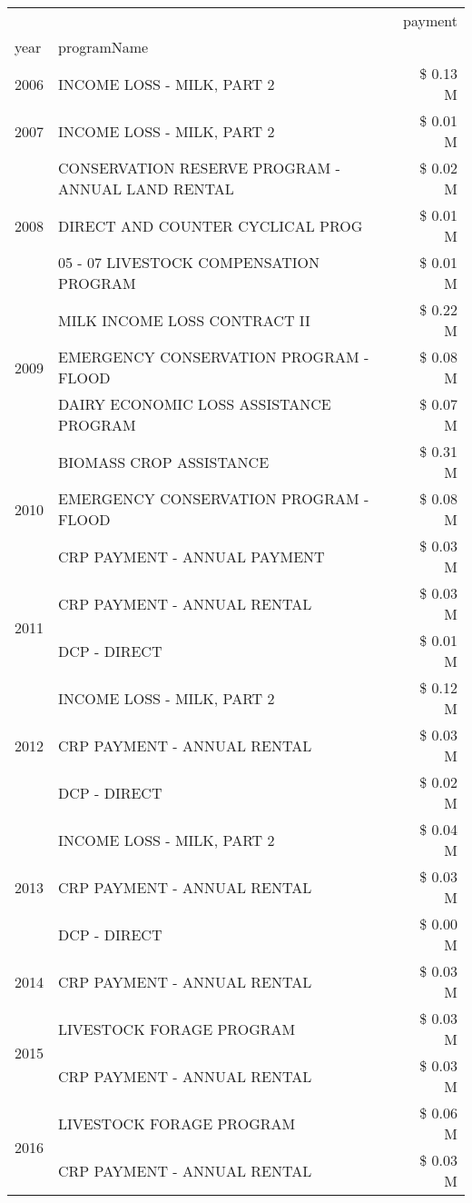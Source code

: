\begin{tabular}{llr}
\toprule
 &  & payment \\
year & programName &  \\
\midrule
2006 & INCOME LOSS - MILK, PART 2 & \$ 0.13 M \\
\cline{1-3}
2007 & INCOME LOSS - MILK, PART 2 & \$ 0.01 M \\
\cline{1-3}
\multirow[t]{3}{*}{2008} & CONSERVATION RESERVE PROGRAM - ANNUAL LAND RENTAL & \$ 0.02 M \\
 & DIRECT AND COUNTER CYCLICAL PROG & \$ 0.01 M \\
 & 05 - 07 LIVESTOCK COMPENSATION PROGRAM & \$ 0.01 M \\
\cline{1-3}
\multirow[t]{3}{*}{2009} & MILK INCOME LOSS CONTRACT II & \$ 0.22 M \\
 & EMERGENCY CONSERVATION PROGRAM - FLOOD & \$ 0.08 M \\
 & DAIRY ECONOMIC LOSS ASSISTANCE PROGRAM & \$ 0.07 M \\
\cline{1-3}
\multirow[t]{3}{*}{2010} & BIOMASS CROP ASSISTANCE & \$ 0.31 M \\
 & EMERGENCY CONSERVATION PROGRAM - FLOOD & \$ 0.08 M \\
 & CRP PAYMENT - ANNUAL PAYMENT & \$ 0.03 M \\
\cline{1-3}
\multirow[t]{2}{*}{2011} & CRP PAYMENT - ANNUAL RENTAL & \$ 0.03 M \\
 & DCP - DIRECT & \$ 0.01 M \\
\cline{1-3}
\multirow[t]{3}{*}{2012} & INCOME LOSS - MILK, PART 2 & \$ 0.12 M \\
 & CRP PAYMENT - ANNUAL RENTAL & \$ 0.03 M \\
 & DCP - DIRECT & \$ 0.02 M \\
\cline{1-3}
\multirow[t]{3}{*}{2013} & INCOME LOSS - MILK, PART 2 & \$ 0.04 M \\
 & CRP PAYMENT - ANNUAL RENTAL & \$ 0.03 M \\
 & DCP - DIRECT & \$ 0.00 M \\
\cline{1-3}
2014 & CRP PAYMENT - ANNUAL RENTAL & \$ 0.03 M \\
\cline{1-3}
\multirow[t]{2}{*}{2015} & LIVESTOCK FORAGE PROGRAM & \$ 0.03 M \\
 & CRP PAYMENT - ANNUAL RENTAL & \$ 0.03 M \\
\cline{1-3}
\multirow[t]{3}{*}{2016} & LIVESTOCK FORAGE PROGRAM & \$ 0.06 M \\
 & CRP PAYMENT - ANNUAL RENTAL & \$ 0.03 M \\

\end{tabular}
